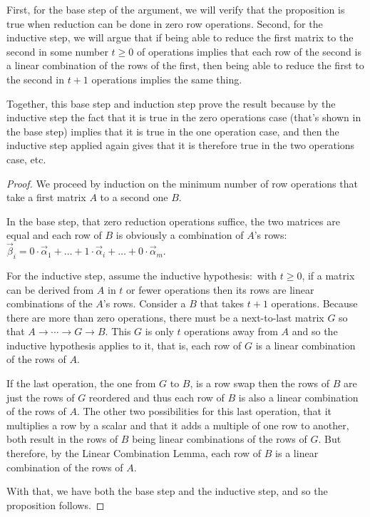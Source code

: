 First, for the base step of the argument, we
will verify that the proposition is true when reduction 
can be done in zero row operations.
Second, for the inductive step, we will 
argue that if being able to reduce the first matrix to the second in some
number $t\geq 0$ of operations implies that each row of the second is a linear
combination of the rows of the first, then being able to reduce the first to
the second in $t+1$ operations implies the same thing.

Together, this base step and induction step prove the result because  
by the inductive step the fact that it is true in the zero operations case
(that's shown in the base step)
implies that it is true in the one operation case, and then the inductive step
applied again gives that it is therefore true in the two operations case, etc.

\begin{proof}
We proceed by induction on the minimum number of row operations that take a
first matrix $A$ to a second one $B$.

In the base step, that
zero reduction operations suffice, the two matrices are equal and each 
row of $B$ is obviously a combination of
$A$'s rows: $\vec{\beta}_i
  =0\cdot\vec{\alpha}_1+\dots+1\cdot\vec{\alpha}_i+\dots+0\cdot\vec{\alpha}_m$.

For the inductive step, assume the inductive hypothesis:~with $t\geq 0$,
if a matrix can be derived from \( A \) in \( t \) or fewer operations 
then its rows are linear combinations of the $A$'s rows.
Consider a $B$ that takes $t+1$ operations.
Because there are more than zero operations, 
there must be a next-to-last matrix $G$  
so that $A\longrightarrow\cdots\longrightarrow G\longrightarrow B$.
This \( G \) is only $t$ operations away from \( A \) and so the inductive
hypothesis applies to it, that is, each row of \( G \)
is a linear combination of the rows of \( A \).

If the last operation, the one from \( G \) to \( B \), is a row swap then
the rows of $B$ are just the rows of $G$ reordered and thus each row of $B$
is also a linear combination of the rows of $A$.
The other two possibilities for this last operation, that it multiplies a 
row by a scalar and that it adds a multiple of one row to another, both result
in the rows of $B$ being linear combinations of the rows of $G$.
But therefore, by the Linear Combination Lemma, each row of $B$ is a linear
combination of the rows of $A$.


With that, we have both the base step and the inductive step, and 
so the proposition follows.
\end{proof}

